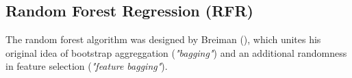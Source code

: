 \documentclass[a4paper,reqno,]{article}
\begin{document}
\subsection{Random Forest Regression (RFR)}
\label{ssec:rfr}
The random forest algorithm was designed by Breiman (\cite{breiman2001random}), which unites his original idea of bootstrap aggreggation (\textit{"bagging"}) and an additional randomness in feature selection (\textit{"feature bagging"}). 
\end{document}
